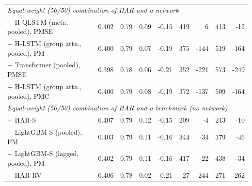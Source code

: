 \begin{tabular}{lrrrrrrrr}
\midrule
\multicolumn{9}{l}{\emph{Equal-weight (50/50) combination of HAR and a network}} \\
+ H-QLSTM (meta, pooled), PMSE & 0.402 & 0.79 & 0.09 & -0.15 & 419 & 6 & 413 & -12 \\
+ H-LSTM (group attn., pooled), PM & 0.400 & 0.79 & 0.07 & -0.19 & 375 & -144 & 519 & -164 \\
+ Transformer (pooled), PMSE & 0.398 & 0.78 & 0.06 & -0.21 & 352 & -221 & 573 & -249 \\
+ H-LSTM (group attn., pooled), PMC & 0.400 & 0.79 & 0.08 & -0.19 & 372 & -137 & 509 & -164 \\
\midrule
\multicolumn{9}{l}{\emph{Equal-weight (50/50) combination of HAR and a benchmark (no network)}} \\
+ HAR-S & 0.407 & 0.79 & 0.12 & -0.15 & 209 & -4 & 213 & -10 \\
+ LightGBM-S (pooled), PM & 0.403 & 0.79 & 0.11 & -0.16 & 344 & -34 & 379 & -46 \\
+ LightGBM-S (lagged, pooled), PM & 0.402 & 0.79 & 0.11 & -0.16 & 417 & -22 & 438 & -34 \\
+ HAR-RV & 0.406 & 0.78 & 0.02 & -0.21 & 27 & -244 & 271 & -262 \\
\bottomrule
\end{tabular}
